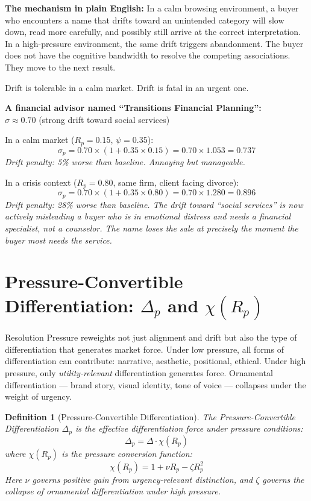 \documentclass[12pt, openany]{book}
\theoremstyle{thmstyle}
\theoremstyle{defstyle}
\newtheorem{definition}{Definition}[chapter]
\begin{document}
\textbf{The mechanism in plain English:} In a calm browsing environment, a buyer who encounters a name that drifts toward an unintended category will slow down, read more carefully, and possibly still arrive at the correct interpretation. In a high-pressure environment, the same drift triggers abandonment. The buyer does not have the cognitive bandwidth to resolve the competing associations. They move to the next result.

Drift is tolerable in a calm market. Drift is fatal in an urgent one.

\begin{examplebox}
\textbf{A financial advisor named ``Transitions Financial Planning'':}\\
$\sigma \approx 0.70$ (strong drift toward social services)

In a calm market ($R_p = 0.15$, $\psi = 0.35$):
\[
\sigma_p = 0.70 \times (1 + 0.35 \times 0.15) = 0.70 \times 1.053 = 0.737
\]
\textit{Drift penalty: 5\% worse than baseline. Annoying but manageable.}

In a crisis context ($R_p = 0.80$, same firm, client facing divorce):
\[
\sigma_p = 0.70 \times (1 + 0.35 \times 0.80) = 0.70 \times 1.280 = 0.896
\]
\textit{Drift penalty: 28\% worse than baseline. The drift toward ``social services'' is now actively misleading a buyer who is in emotional distress and needs a financial specialist, not a counselor. The name loses the sale at precisely the moment the buyer most needs the service.}
\end{examplebox}

\section{Pressure-Convertible Differentiation: $\Delta_p$ and $\chi(R_p)$}

Resolution Pressure reweights not just alignment and drift but also the type of differentiation that generates market force. Under low pressure, all forms of differentiation can contribute: narrative, aesthetic, positional, ethical. Under high pressure, only \textit{utility-relevant} differentiation generates force. Ornamental differentiation --- brand story, visual identity, tone of voice --- collapses under the weight of urgency.

\begin{definition}[Pressure-Convertible Differentiation]
The Pressure-Convertible Differentiation $\Delta_p$ is the effective differentiation force under pressure conditions:
\begin{equation}
\Delta_p = \Delta \cdot \chi(R_p)
\label{eq:pressure_diff}
\end{equation}
where $\chi(R_p)$ is the pressure conversion function:
\begin{equation}
\chi(R_p) = 1 + \nu R_p - \zeta R_p^2
\label{eq:chi}
\end{equation}
Here $\nu$ governs positive gain from urgency-relevant distinction, and $\zeta$ governs the collapse of ornamental differentiation under high pressure.
\end{definition}
\end{document}
